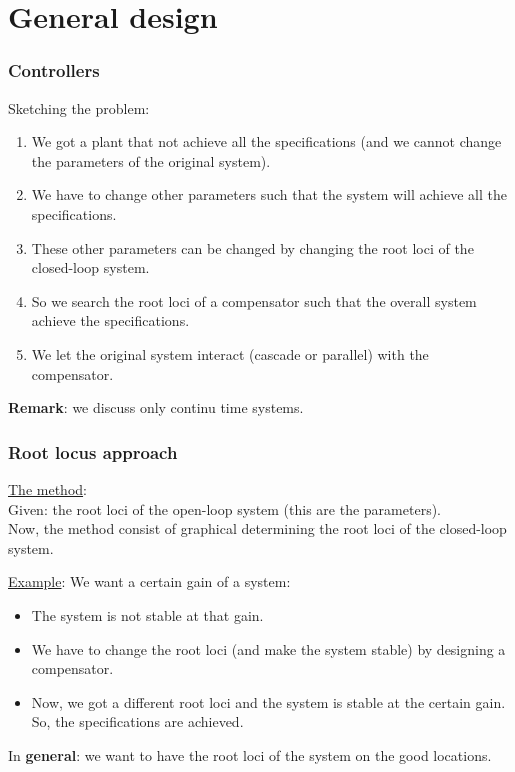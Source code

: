 \section{General design}

\begin{frame}
	\frametitle{Controllers}
		Sketching the problem:
		\begin{enumerate}
			\item We got a plant that not achieve all the specifications (and we cannot change the parameters of the original system).
			\item We have to change other parameters such that the system will achieve all the specifications.
			\item These other parameters can be changed by changing the root loci of the closed-loop system. 
			\item So we search the root loci of a compensator such that the overall system achieve the specifications. 
			\item We let the original system interact (cascade or parallel) with the compensator.
		\end{enumerate}
		\vspace{3mm}
		
		\textbf{Remark}: we discuss only continu time systems. 
\end{frame}

\begin{frame}
	\frametitle{Root locus approach}
	\underline{The method}:\\
	Given: the root loci of the open-loop system (this are the parameters).\\
	Now, the method consist of graphical determining the root loci of the closed-loop system.\vspace{3mm}

	\underline{Example}: 
	We want a certain gain of a system:
	\begin{itemize}
		\item The system is not stable at that gain.
		\item We have to change the root loci (and make the system stable) by designing a compensator.
		\item Now, we got a different root loci and the system is stable at the certain gain. So, the specifications are achieved.
	\end{itemize}
	\vspace{2mm}
	
	In \textbf{general}: we want to have the root loci of the system on the good locations.
\end{frame}

